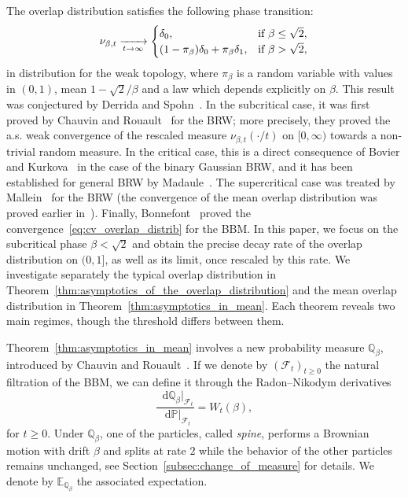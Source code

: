 \documentclass[AHL,Unicode,longabstracts,published]{cedram}
\renewcommand{\d}[1]{\mathop{}\!\mathrm{d}#1}
\newcommand{\E}{\mathbb{E}}
\renewcommand{\P}{\mathbb{P}}
\newcommand{\Q}{\mathbb{Q}}
\newcommand\1{\mathds{1}}
\newcommand{\cF}{\mathcal{F}}
\renewcommand*{\to}{\mathchoice{\longrightarrow}{\rightarrow}{\rightarrow}{\rightarrow}}
\begin{document}
The overlap distribution satisfies the following phase transition:
\begin{equation}\label{eq:cv_overlap_distrib}
\nu_{\beta, t}
\xrightarrow[t\to\infty]{}
\begin{cases}
\delta_0, &\text{if } \beta \leq \sqrt{2}, \\
(1 - \pi_\beta) \delta_0 + \pi_\beta \delta_1, &\text{if } \beta > \sqrt{2},
\end{cases}
\end{equation}
in distribution for the weak topology, where $\pi_\beta$ is a random variable with values in $(0,1)$, mean $1-\sqrt{2}/\beta$ and a law which depends explicitly on $\beta$. This result was conjectured by Derrida and Spohn~\cite{DerridaSpohn1988}. In the subcritical case, it was first proved by Chauvin and Rouault~\cite{ChauvinRouault1997} for the BRW; more precisely, they proved the a.s. weak convergence of the rescaled measure $\nu_{\beta,t}(\cdot/t)$ on $[0,\infty)$ towards a non-trivial random measure. In the critical case, this is a direct consequence of Bovier and Kurkova~\cite{BovierKurkova2004} in the case of the binary Gaussian BRW, and it has been established for general BRW by Madaule~\cite{Madaule2016}. The supercritical case was treated by Mallein~\cite{Mallein2018} for the BRW (the convergence of the mean overlap distribution was proved earlier in~\cite{BovierKurkova2004}). Finally, Bonnefont~\cite{Bonnefont2022} proved the convergence~\eqref{eq:cv_overlap_distrib} for the BBM. In this paper, we focus on the subcritical phase $\beta < \sqrt{2}$ and obtain the precise decay rate of the overlap distribution on $(0,1]$, as well as its limit, once rescaled by this rate. We investigate separately the typical overlap distribution in Theorem~\ref{thm:asymptotics_of_the_overlap_distribution} and the mean overlap distribution in Theorem~\ref{thm:asymptotics_in_mean}. Each theorem reveals two main regimes, though the threshold differs between them.



Theorem~\ref{thm:asymptotics_in_mean} involves a new probability measure $\Q_{\beta}$, introduced by Chauvin and Rouault~\cite{ChauvinRouault1988}. If we denote by $(\cF_t)_{t \geq 0}$ the natural filtration of the BBM, we can define it through the Radon--Nikodym derivatives
\begin{equation}\label{eq:definition_of_Q_b_without_spine}
\frac{\d{\Q_{\beta}|_{\cF_t}}}{\d{\P|_{\cF_t}}} = W_t(\beta),
\end{equation}
for $t \geq 0$. Under $\Q_{\beta}$, one of the particles, called \emph{spine}, performs a Brownian motion with drift $\beta$ and splits at rate $2$ while the behavior of the other particles remains unchanged, see Section~\ref{subsec:change_of_measure} for details. We denote by $\E_{\Q_\beta}$ the associated expectation.
\end{document}
